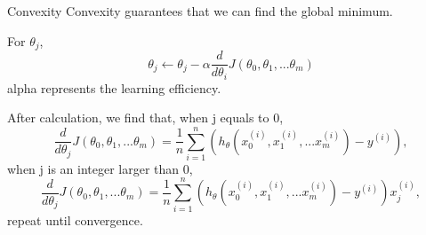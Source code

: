 \documentclass{beamer}
\begin{document}
\begin{frame}{Convexity}
Convexity guarantees that we can find the global minimum.\\
\begin{theorem}

For $\theta_j$,
                    $$ \theta_j \leftarrow \theta_j-\alpha \frac{d}{d\theta_i}J(\theta_0,\theta_1,...\theta_m)$$
alpha represents the learning efficiency.
\end{theorem}
After calculation, we find that,
when j equals to 0,\\
$$\frac{d}{d\theta_j}J(\theta_0,\theta_1,...\theta_m)=\frac{1}{n}\sum_{i=1}^{n}(h_{\theta}(x_0^{(i)},x_1^{(i)},...x_m^{(i)})-y^{(i)}),$$
when j is an integer larger than 0,\\
$$\frac{d}{d\theta_j}J(\theta_0,\theta_1,...\theta_m)=\frac{1}{n}\sum_{i=1}^{n}(h_{\theta}(x_0^{(i)},x_1^{(i)},...x_m^{(i)})-y^{(i)})x_j^{(i)},$$
repeat until convergence.


\end{frame}
\end{document}
